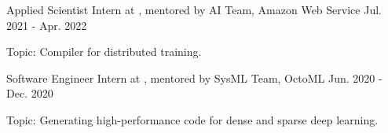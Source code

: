 

\begin{cventries}

\cventry
{Applied Scientist Intern at , mentored by } %
{AI Team, Amazon Web Service} %
{Jul. 2021 - Apr. 2022} %
{} %
{
	\begin{cvitems} %
		\item{Topic: Compiler for distributed training.}
	\end{cvitems}
}

\cventry
	{Software Engineer Intern at , mentored by } %
	{SysML Team, OctoML} %
	{Jun. 2020 - Dec. 2020} %
	{} %
	{
		\begin{cvitems} %
			\item{Topic: Generating high-performance code for dense and sparse deep learning.}
		\end{cvitems}
    }

\end{cventries}
